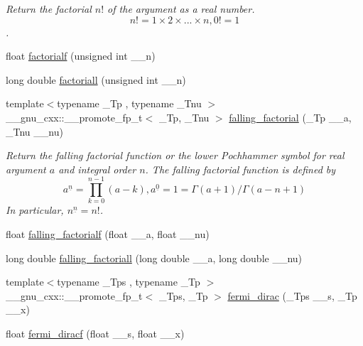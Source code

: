 \begin{DoxyCompactItemize}
\begin{DoxyCompactList}\small\item\em Return the factorial $ n! $ of the argument as a real number. \[ n! = 1 \times 2 \times ... \times n, 0! = 1 \]. \end{DoxyCompactList}\item 
float \hyperlink{group__gnu__math__spec__func_ga5a288283a8ed63e1d2b0145f313a5378}{factorialf} (unsigned int \+\_\+\+\_\+n)
\item 
long double \hyperlink{group__gnu__math__spec__func_ga0904e504fdc3c8b9b6f5c66a73531584}{factoriall} (unsigned int \+\_\+\+\_\+n)
\item 
{\footnotesize template$<$typename \+\_\+\+Tp , typename \+\_\+\+Tnu $>$ }\\\+\_\+\+\_\+gnu\+\_\+cxx\+::\+\_\+\+\_\+promote\+\_\+fp\+\_\+t$<$ \+\_\+\+Tp, \+\_\+\+Tnu $>$ \hyperlink{group__gnu__math__spec__func_gad2388b5c45ec3d5d5f80032b08a03e7e}{falling\+\_\+factorial} (\+\_\+\+Tp \+\_\+\+\_\+a, \+\_\+\+Tnu \+\_\+\+\_\+nu)
\begin{DoxyCompactList}\small\item\em Return the falling factorial function or the lower Pochhammer symbol for real argument $ a $ and integral order $ n $. The falling factorial function is defined by \[ a^{\underline{n}} = \prod_{k=0}^{n-1} (a - k), a^{\underline{0}} = 1 = \Gamma(a + 1) / \Gamma(a - n + 1) \] In particular, $ n^{\underline{n}} = n! $. \end{DoxyCompactList}\item 
float \hyperlink{group__gnu__math__spec__func_gaf32abbc790bfa870725728e5470de532}{falling\+\_\+factorialf} (float \+\_\+\+\_\+a, float \+\_\+\+\_\+nu)
\item 
long double \hyperlink{group__gnu__math__spec__func_gab816c3bcbe00595881799ce969475085}{falling\+\_\+factoriall} (long double \+\_\+\+\_\+a, long double \+\_\+\+\_\+nu)
\item 
{\footnotesize template$<$typename \+\_\+\+Tps , typename \+\_\+\+Tp $>$ }\\\+\_\+\+\_\+gnu\+\_\+cxx\+::\+\_\+\+\_\+promote\+\_\+fp\+\_\+t$<$ \+\_\+\+Tps, \+\_\+\+Tp $>$ \hyperlink{group__gnu__math__spec__func_ga47dd583a4f3a19f797a5e074e357ba36}{fermi\+\_\+dirac} (\+\_\+\+Tps \+\_\+\+\_\+s, \+\_\+\+Tp \+\_\+\+\_\+x)
\item 
float \hyperlink{group__gnu__math__spec__func_gacf7f49b2b7bf50fd37d939236712cbe2}{fermi\+\_\+diracf} (float \+\_\+\+\_\+s, float \+\_\+\+\_\+x)
\item 

\end{DoxyCompactItemize}
